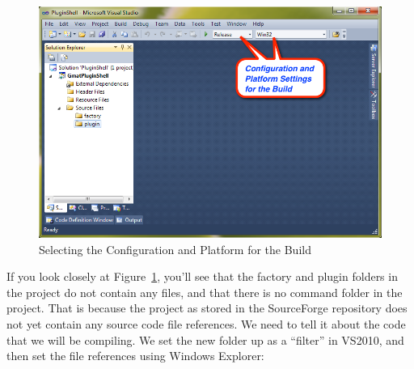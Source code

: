 \documentclass[10pt,letterpaper]{article}
\begin{document}
\begin{figure}[htb]
\begin{center}
\includegraphics[scale=.5]{images/VS2010BuildSettings.png}
\caption{\label{VS2010PlatformSettings}Selecting the Configuration and Platform for the Build}
\end{center}
\end{figure} 

If you look closely at Figure~\ref{VS2010PlatformSettings}, you'll see that the factory and plugin folders in the project do not contain any files, and that there is no command folder in the project.  That is because the project as stored in the SourceForge repository does not yet contain any source code file references.  We need to tell it about the code that we will be compiling.  We set the new folder up as a ``filter'' in VS2010, and then set the file references using Windows Explorer:
\end{document}
